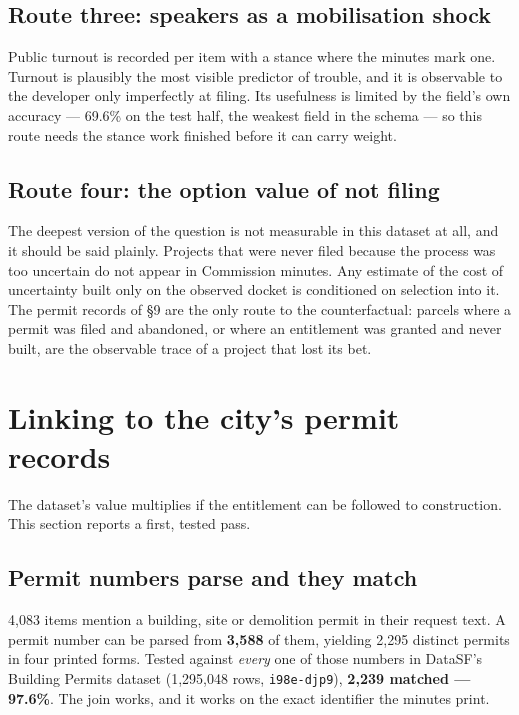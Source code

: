 \documentclass[11pt]{article}
\begin{document}
\subsection{Route three: speakers as a mobilisation shock}

Public turnout is recorded per item with a stance where the minutes mark one. Turnout is
plausibly the most visible predictor of trouble, and it is observable to the developer only
imperfectly at filing. Its usefulness is limited by the field's own accuracy --- 69.6\% on
the test half, the weakest field in the schema --- so this route needs the stance work
finished before it can carry weight.

\subsection{Route four: the option value of not filing}

The deepest version of the question is not measurable in this dataset at all, and it should be
said plainly. Projects that were never filed because the process was too uncertain do not
appear in Commission minutes. Any estimate of the cost of uncertainty built only on the
observed docket is conditioned on selection into it. The permit records of \S9 are the only
route to the counterfactual: parcels where a permit was filed and abandoned, or where an
entitlement was granted and never built, are the observable trace of a project that lost its
bet.

\section{Linking to the city's permit records}
\label{sec:permits}

The dataset's value multiplies if the entitlement can be followed to construction. This
section reports a first, tested pass.

\subsection{Permit numbers parse and they match}

4{,}083 items mention a building, site or demolition permit in their request text. A permit
number can be parsed from \textbf{3{,}588} of them, yielding 2{,}295 distinct permits in four
printed forms. Tested against \emph{every} one of those numbers in DataSF's Building Permits
dataset (1{,}295{,}048 rows, \texttt{i98e-djp9}), \textbf{2{,}239 matched --- 97.6\%}. The join
works, and it works on the exact identifier the minutes print.
\end{document}
